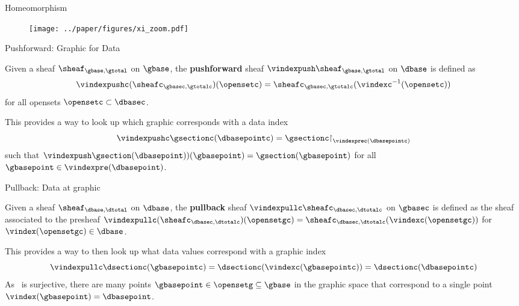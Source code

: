 \documentclass[xcolor={dvipsnames}]{beamer}
\renewcommand{\restriction}{\mathord{\upharpoonright}} %
\begin{document}
\begin{frame}{Homeomorphism}
    \begin{figure}
        \texttt{[image: ../paper/figures/xi\_zoom.pdf]}
    \end{figure}
\end{frame}

\begin{frame}{Pushforward: Graphic for Data}
    \begin{definition} Given a sheaf $\sheaf_{\gbase, \gtotal}$ on $\gbase$, the \textbf{pushforward} sheaf  $\vindexpush\sheaf_{\gbase, \gtotal}$ on $\dbase$ is defined as
        \begin{equation}
          \vindexpushc(\sheafc_{\gbasec, \gtotalc})(\opensetc)  = \sheafc_{\gbasec, \gtotalc}(\vindexc^{-1}(\opensetc))
        \end{equation}
      for all opensets $\opensetc \subset \dbasec$\cite{harder2008lectures}.
    \end{definition}
This provides a way to look up which graphic corresponds with a data index
\begin{equation}
  \label{eq:atct:sheaf:pushforward_select}
  \vindexpushc\gsectionc(\dbasepointc) = \gsectionc\restriction_{\vindexprec(\dbasepointc)}
\end{equation}
such that $\vindexpush\gsection(\dbasepoint))(\gbasepoint) = \gsection(\gbasepoint)$ for all $\gbasepoint \in \vindexpre(\dbasepoint)$.
\end{frame}

\begin{frame}{Pullback: Data at graphic }
    \begin{definition} \cite{harder2008lectures} Given a sheaf $\sheaf_{\dbase, \dtotal}$ on $\dbase$, the \textbf{pullback} sheaf $\vindexpullc\sheafc_{\dbasec, \dtotalc}$ on $\gbasec$ is defined as the sheaf associated to the presheaf $\vindexpullc(\sheafc_{\dbasec, \dtotalc})(\opensetgc) = \sheafc_{\dbasec, \dtotalc}(\vindexc(\opensetgc))$ for $\vindex(\opensetgc) \in \dbase$.
    \end{definition}

    This provides a way to then look up what data values correspond with a graphic index
    \begin{equation}
      \label{eq:atct:sheaf:pullback_hover}
      \vindexpullc\dsectionc(\gbasepointc) = \dsectionc(\vindexc(\gbasepointc)) = \dsectionc(\dbasepointc)
    \end{equation}
    As \vindex\ is surjective, there are many points $\gbasepoint \in \opensetg\subseteq\gbase$ in the graphic space that correspond to a single point $\vindex(\gbasepoint) = \dbasepoint$.
\end{frame}
\end{document}
